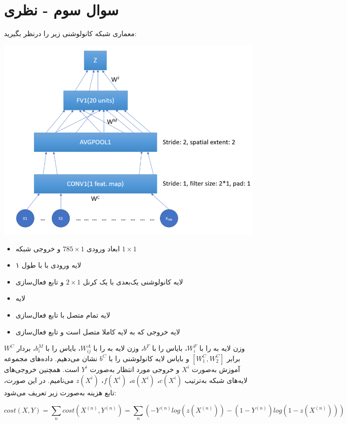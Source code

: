 \section{سوال سوم - نظری}

معماری شبکه کانولوشنی زیر را درنظر بگیرید:

\begin{center}
	\includegraphics*[width=0.6\linewidth]{pics/img1.png}
	\label{شبکه کانولوشنی مورد بررسی در سوال سوم}
\end{center}


\begin{itemize}
	\item ابعاد ورودی $785\times 1$ و خروجی شبکه $1\times 1$
	\item لایه ورودی  با  با طول ۱
	\item لایه کانولوشنی یک‌بعدی  با یک کرنل $2\times 1$ و تابع فعال‌سازی 
	\item لایه 
	\item لایه تمام متصل  با تابع فعال‌سازی 
		\item لایه خروجی  که به لایه  کاملا متصل است و تابع فعال‌سازی 
\end{itemize}



 وزن لایه  به  را با $W_i^F $، بایاس  را با $b^F$، وزن لایه  به  را با $W_{ij}^A$، بایاس  را با $b_i^M$، بردار $W^C$ برابر $[W_1^C, W_2^C]$ و بایاس لایه کانولوشنی را با $b^C$ نشان می‌دهیم. داده‌های مجموعه آموزش به‌صورت $X^i$ و خروجی مورد انتظار به‌صورت $Y^i$ است. همچنین خروجی‌های لایه‌های شبکه به‌ترتیب $c(X^i)$،
 $a(X^i)$،
 $f(X^i)$،
 $z(X^i )$
 می‌نامیم. در این صورت، تابع هزینه به‌صورت زیر تعریف می‌شود:
 
 $$ cost(X,Y)=\sum_{n} cost(X^{(n)}, Y^{(n)})=\sum_{n}(-Y^{(n)}log(z(X^{(n)}))-(1-Y^{(n)})log(1-z(X^{(n)}))) $$


